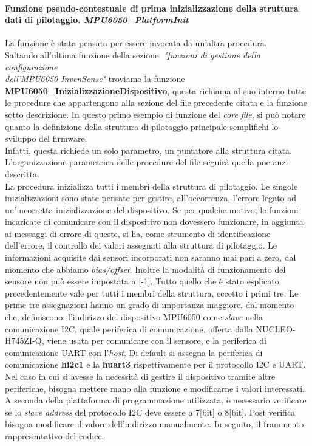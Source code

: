 \paragraph{Funzione pseudo-contestuale di prima inizializzazione della struttura dati di pilotaggio. \textit{MPU6050\_PlatformInit}}
La funzione è stata pensata per essere invocata da un'altra procedura.\\
Saltando all'ultima funzione della sezione: \textit{"funzioni di gestione della configurazione\\dell'MPU6050 InvenSense"} troviamo la funzione
\textbf{MPU6050\_InizializzazioneDispositivo}, questa richiama al suo interno tutte le procedure che appartengono alla sezione del file precedente citata e la funzione sotto descrizione.
In questo primo esempio di funzione del \textit{core file}, si può notare quanto la definizione della struttura di pilotaggio principale semplifichi lo sviluppo del firmware.\\
Infatti, questa richiede un solo parametro, un puntatore alla struttura citata.\\ 
L'organizzazione parametrica delle procedure del file seguirà quella poc anzi descritta.\\
La procedura inizializza tutti i membri della struttura di pilotaggio. Le singole inizializzazioni sono state pensate per gestire, all'occorrenza, l'errore legato ad un'incorretta inizializzazione del dispositivo. 
Se per qualche motivo, le funzioni incaricate di comunicare con il dispositivo non dovessero funzionare, in aggiunta ai messaggi di errore di queste, si ha, come strumento di identificazione dell'errore, il controllo dei valori 
assegnati alla struttura di pilotaggio. Le informazioni acquisite dai sensori incorporati non saranno mai pari a zero, dal momento che abbiamo \textit{bias/offset}. Inoltre la modalità di funzionamento del sensore non può essere impostata a [-1].
Tutto quello che è stato esplicato precedentemente vale per tutti i membri della struttura, eccetto i primi tre. Le prime tre assegnazioni hanno un grado di importanza maggiore, dal momento che, definiscono: l'indirizzo del dispositivo MPU6050 come \textit{slave} nella comunicazione I2C, quale periferica di comunicazione, offerta dalla NUCLEO-H745ZI-Q, viene usata per comunicare con il sensore, e la periferica di comunicazione UART con l'\textit{host}.
Di default si assegna la periferica di comunicazione \textbf{hi2c1} e la \textbf{huart3} rispettivamente per il protocollo I2C e UART. Nel caso in cui si avesse la necessità di gestire il dispositivo tramite altre periferiche, bisogna mettere mano alla funzione e modificarne i valori interessati.
A seconda della piattaforma di programmazione utilizzata, è necessario verificare se lo \textit{slave address} del protocollo I2C deve essere a 7[bit] o 8[bit]. Post verifica bisogna modificare il valore dell'indirizzo manualmente. 
In seguito, il frammento rappresentativo del codice.


